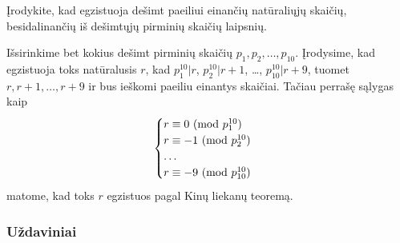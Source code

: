 \begin{pavnr}
  Įrodykite, kad egzistuoja dešimt paeiliui einančių natūraliųjų skaičių,
  besidalinančių iš dešimtųjų pirminių skaičių laipsnių. 
\end{pavnr}
 
\begin{sprendimas} Išsirinkime bet kokius dešimt pirminių skaičių $p_1, p_2, \dots,
p_{10}.$ Įrodysime, kad egzistuoja toks natūralusis $r$, kad
$p_1^{10}|r$,
$p_2^{10}|r+1$, \ldots, $p_{10}^{10}|r+9$, tuomet $r, r+1, \dots, r+9$ ir
bus ieškomi paeiliu einantys skaičiai. Tačiau perrašę sąlygas kaip
$$\begin{cases}
  r \equiv 0 \ (\text{mod } p_1^{10})\\
  r \equiv -1 \ (\text{mod } p_2^{10})\\
  \hdots \\
  r \equiv -9 \ (\text{mod } p_{10}^{10})
\end{cases}$$
matome, kad toks $r$ egzistuos pagal Kinų liekanų teoremą.
\end{sprendimas}
  
\subsubsection{Uždaviniai}

